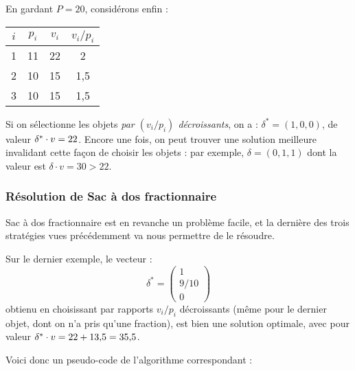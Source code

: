			\begin{Exemple} En gardant \(P = 20\), considérons enfin : 
				\begin{center}
					\begin{tabular}[t]{| c | c | c | c |}
						\hline
						$i$ & $p_i$ & $v_i$ & $v_i/p_i$\\ \hline
						1 & 11 & 22 & 2\\ \hline
						2 & 10 & 15 & 1,5 \\ \hline
						3 & 10 & 15 & 1,5 \\ \hline
					\end{tabular}
				\end{center}
				Si on sélectionne les objets \emph{par $(v_i / p_i)$ décroissants}, on a : $\delta^* = (1,0,0)$, de valeur $\delta^* \cdot v = 22$. \nt
				Encore une fois, on peut trouver une solution meilleure invalidant cette façon de choisir les objets : par exemple, \( \delta = (0,1,1) \) dont la valeur est \(\delta \cdot v = 30 > 22\).
			\end{Exemple}
			
			\subsubsection{Résolution de \textsf{Sac à dos fractionnaire}}
			
			\textsf{Sac à dos fractionnaire} est en revanche un problème facile, et la dernière des trois stratégies vues précédemment va nous permettre de le résoudre.
			
			\begin{Exemple}
				Sur le dernier exemple, le vecteur :
					\[\delta^* = \begin{pmatrix} 1 \\ 9/10 \\ 0 \end{pmatrix} \]
				obtienu en choisissant par rapports \(v_i/p_i\) décroissants (même pour le dernier objet, dont on n'a pris qu'une fraction), est bien une solution optimale, avec pour valeur \( \delta^* \cdot v = 22 + \text{13,5} = \text{35,5} \).
			\end{Exemple}
			
			Voici donc un pseudo-code de l'algorithme correspondant :
			
